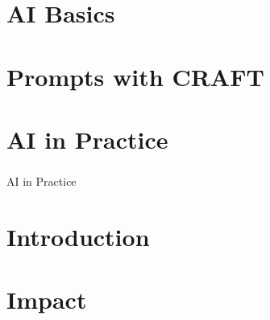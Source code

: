 
\section[Core]{AI Basics}



\section[Prompts]{Prompts with CRAFT}


\section[Practice]{AI in Practice}
\begin{frame}[fragile]\frametitle{}
\begin{center}
{\Large AI in Practice}
\end{center}
\end{frame}

\section[Intro]{Introduction}
% 

\section[Impact]{Impact}


